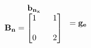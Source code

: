 \documentclass[preview]{standalone}
\begin{document}
\begin{align*}
\begin{array}{c}\begin{matrix}\hspace{1cm} \mathbf{b_{n_x}}  \quad \hspace{0.6cm} \end{matrix} \\ \mathbf{B_n} = \begin{bmatrix} 1 & \quad 1 \\ \\0 &  \quad 2 \end{bmatrix} \end{array} = \mathbf{g_e}
\end{align*}
\end{document}
